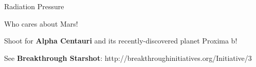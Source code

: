 %
%
%

\begin{frame}{Radiation Pressure}

Who cares about Mars!\\
\vspace{0.2cm}

Shoot for {\bf Alpha Centauri} and its recently-discovered planet Proxima b!
\vspace{0.2cm}

See {\bf Breakthrough Starshot}:
{\color{blue}http://breakthroughinitiatives.org/Initiative/3}\\

\end{frame}



%
%

